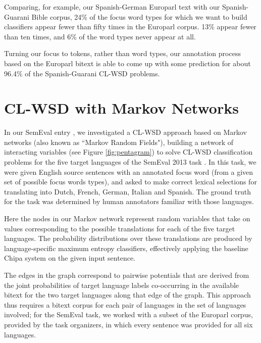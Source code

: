 Comparing, for example, our Spanish-German Europarl text with our
Spanish-Guarani Bible corpus, 24\% of the focus word types for which we want to
build classifiers appear fewer than fifty times in the Europarl corpus. 13\%
appear fewer than ten times, and 6\% of the word types never appear at all.

Turning our focus to tokens, rather than word types, our annotation process
based on the Europarl bitext is able to come up with some prediction for
about 96.4\% of the Spanish-Guarani CL-WSD problems.




\section{CL-WSD with Markov Networks}
\label{sec:multilingual-mrf}
In our SemEval entry \cite{rudnick-liu-gasser:2013:SemEval-2013}, we
investigated a CL-WSD approach based on Markov networks (also known as ``Markov
Random Fields"), building a network of interacting variables (see Figure
\ref{fig:pentagram}) to solve CL-WSD classification problems for the five
target languages of the SemEval 2013 task \cite{task10}. In this task, we were
given English source sentences with an annotated focus word (from a given set
of possible focus words types), and asked to make correct lexical selections
for translating into Dutch, French, German, Italian and Spanish. The ground
truth for the task was determined by human annotators familiar with those
languages.

Here the nodes in our Markov network represent random variables that take on
values corresponding to the possible translations for each of the five target
languages. The probability distributions over these translations are produced
by language-specific maximum entropy classifiers, effectively applying the
baseline Chipa system on the given input sentence.

The edges in the graph correspond to pairwise potentials that are derived from
the joint probabilities of target language labels co-occurring in the available
bitext for the two target languages along that edge of the graph. This approach
thus requires a bitext corpus for each pair of languages in the set of
languages involved; for the SemEval task, we worked with a subset of the
Europarl corpus, provided by the task organizers, in which every sentence was
provided for all six languages.

